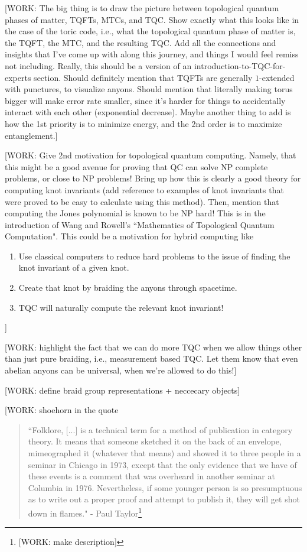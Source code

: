 \documentclass{article}
\theoremstyle{definition}
\numberwithin{figure}{section}
\begin{document}
[WORK: The big thing is to draw the picture between topological quantum phases of matter, TQFTs, MTCs, and TQC. Show exactly what this looks like in the case of the toric code, i.e., what the topological quantum phase of matter is, the TQFT, the MTC, and the resulting TQC. Add all the connections and insights that I've come up with along this journey, and things I would feel remiss not including. Really, this should be a version of an introduction-to-TQC-for-experts section. Should definitely mention that TQFTs are generally $1$-extended with punctures, to visualize anyons. Should mention that literally making torus bigger will make error rate smaller, since it's harder for things to accidentally interact with each other (exponential decrease). Maybe another thing to add is how the 1st priority is to minimize energy, and the 2nd order is to maximize entanglement.]

[WORK: Give 2nd motivation for topological quantum computing. Namely, that this might be a good avenue for proving that QC can solve NP complete problems, or close to NP problems! Bring up how this is clearly a good theory for computing knot invariants (add reference to examples of knot invariants that were proved to be easy to calculate using this method). Then, mention that computing the Jones polynomial is known to be NP hard! This is in the introduction of Wang and Rowell's ``Mathematics of Topological Quantum Computation". This could be a motivation for hybrid computing like

\begin{enumerate}
\item Use classical computers to reduce hard problems to the issue of finding the knot invariant of a given knot.
\item Create that knot by braiding the anyons through spacetime.
\item TQC will naturally compute the relevant knot invariant!
\end{enumerate}
]

[WORK: highlight the fact that we can do more TQC when we allow things other than just pure braiding, i.e., measurement based TQC. Let them know that even abelian anyons can be universal, when we're allowed to do this!]

[WORK: define braid group representations + neccecary objects]

[WORK: shoehorn in the quote

\begin{quote}
``Folklore, [...] is a technical term for a method of publication in category theory. It means that someone sketched it on the back of an envelope, mimeographed it (whatever that means) and showed it to three people in a seminar in Chicago in 1973, except that the only evidence that we have of these events is a comment that was overheard in another seminar at Columbia in 1976. Nevertheless, if some younger person is so presumptuous as to write out a proper proof and attempt to publish it, they will get shot down in flames." - Paul Taylor\footnote{[WORK: make description]\cite{aubert2019categories}}
\end{quote}
\end{document}
